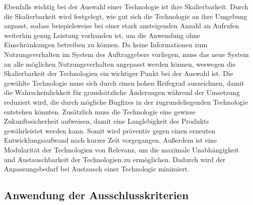\newparagraph
Ebenfalls wichtig bei der Auswahl einer Technologie ist ihre Skalierbarkeit. Durch die Skalierbarkeit wird festgelegt, wie gut sich die Technologie an ihre Umgebung anpasst, sodass beispielsweise bei einer stark ansteigenden Anzahl an Aufrufen weiterhin genug Leistung vorhanden ist, um die Anwendung ohne Einschränkungen betreiben zu können. Da keine Informationen zum Nutzungsverhalten im System des Auftraggebers vorliegen, muss das neue System an alle möglichen Nutzungsverhalten angepasst werden können, weswegen die Skalierbarkeit der Technologien ein wichtiger Punkt bei der Auswahl ist.
\newparagraph
Die gewählte Technologie muss sich durch einen hohen Reifegrad auszeichnen, damit die Wahrscheinlichkeit für grundsätzliche Änderungen während der Umsetzung reduziert wird, die durch mögliche Bugfixes in der zugrundeliegenden Technologie entstehen könnten.
Zusätzlich muss die Technologie eine gewisse Zukunftssicherheit aufweisen, damit eine Langlebigkeit des Produkts gewährleistet werden kann. Somit wird präventiv gegen einen erneuten Entwicklungsaufwand nach kurzer Zeit vorgegangen.
\newparagraph
Außerdem ist eine Modularität der Technologien von Relevanz, um die maximale Unabhängigkeit und Austauschbarkeit der Technologien zu ermöglichen. Dadurch wird der Anpassungsbedarf bei Austausch einer Technologie minimiert.

\subsection{Anwendung der Ausschlusskriterien}
